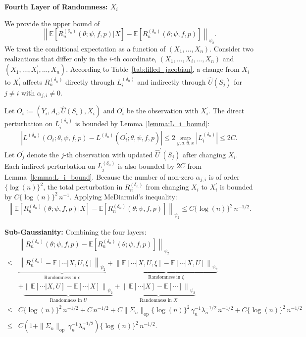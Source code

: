 \documentclass[12pt]{article}
\newcommand{\E}{\mathbb{E}}
\begin{document}
\noindent\textbf{Fourth Layer of Randomness: $X_i$}

\noindent We provide the upper bound of
$$\left\|\E\left[R_n^{(\delta_n)}(\theta;\psi,f,p)|X\right]-\E\left[R_n^{(\delta_n)}(\theta;\psi,f,p)\right]\right\|_{\psi_2}.$$
We treat the conditional expectation as a function of $(X_1,\ldots,X_n)$. Consider two realizations that differ only in the $i$-th coordinate, $(X_1,\ldots,X_i,\ldots,X_n)$ and $(X_1,\ldots,X_i^\prime,\ldots,X_n)$. According to Table~\ref{tab:filled_jacobian}, a change from $X_i$ to $X_i^\prime$ affects $R_n^{(\delta_n)}$ directly through $L_i^{(\delta_n)}$ and indirectly through $\widehat U(S_j)$ for $j\neq i$ with $\alpha_{j,i}\neq 0$.

Let $O_i:=(Y_i,A_i,\widehat U(S_i),X_i)$ and $O_i^\prime$ be the observation with $X_i^\prime$. The direct perturbation on $L_i^{(\delta_n)}$ is bounded by Lemma~\ref{lemma:L_i_bound}:
\begin{align*}
\left|L^{(\delta_n)}(O_i;\theta,\psi,f,p) - L^{(\delta_n)}(O_i^\prime;\theta,\psi,f,p)\right|
\leq 2\sup_{y,a,u,x}\left|L^{(\delta_n)}_i\right| \leq 2C.
\end{align*}
Let $O_j^\prime$ denote the $j$-th observation with updated $\widehat U^\prime(S_j)$ after changing $X_i$. Each indirect perturbation on $L_j^{(\delta_n)}$ is also bounded by $2C$ from Lemma~\ref{lemma:L_i_bound}. Because the number of non-zero $\alpha_{j,i}$ is of order $\{\log(n)\}^2$, the total perturbation in $R_n^{(\delta_n)}$ from changing $X_i$ to $X_i^\prime$ is bounded by $C\{\log(n)\}^2\,n^{-1}$. Applying McDiarmid's inequality:
\begin{align*}
\left\|\E\left[R_n^{(\delta_n)}(\theta;\psi,f,p)|X\right]-\E\left[R_n^{(\delta_n)}(\theta;\psi,f,p)\right]\right\|_{\psi_2}
\leq C\{\log(n)\}^2\,n^{-1/2}.
\end{align*}

\noindent\textbf{Sub-Gaussianity:} Combining the four layers:
\begin{align*}
&\left\|R_n^{(\delta_n)}(\theta;\psi,f,p)-\E\left[R_n^{(\delta_n)}(\theta;\psi,f,p)\right]\right\|_{\psi_2}\\
\leq &\underbrace{\left\|R_n^{(\delta_n)}-\E\left[\cdots|X,U,\xi\right]\right\|_{\psi_2}}_{\text{Randomness in $\epsilon$}}
+\underbrace{\left\|\E\left[\cdots|X,U,\xi\right]-\E\left[\cdots|X,U\right]\right\|_{\psi_2}}_{\text{Randomness in $\xi$}}\\
&+\underbrace{\left\|\E\left[\cdots|X,U\right]-\E\left[\cdots|X\right]\right\|_{\psi_2}}_{\text{Randomness in $U$}}
+\underbrace{\left\|\E\left[\cdots|X\right]-\E\left[\cdots\right]\right\|_{\psi_2}}_{\text{Randomness in $X$}}\\
\leq &C\{\log(n)\}^2\,n^{-1/2} + C\,n^{-1/2} + C\|\Sigma_n\|_{\mathrm{op}}\{\log(n)\}^2\,\gamma_n^{-1}\lambda_n^{-1/2}\,n^{-1/2} + C\{\log(n)\}^2\,n^{-1/2}\\
\leq &C\left(1+\|\Sigma_n\|_{\mathrm{op}}\,\gamma_n^{-1}\lambda_n^{-1/2}\right)\{\log(n)\}^2\,n^{-1/2}.
\end{align*}
\end{document}
